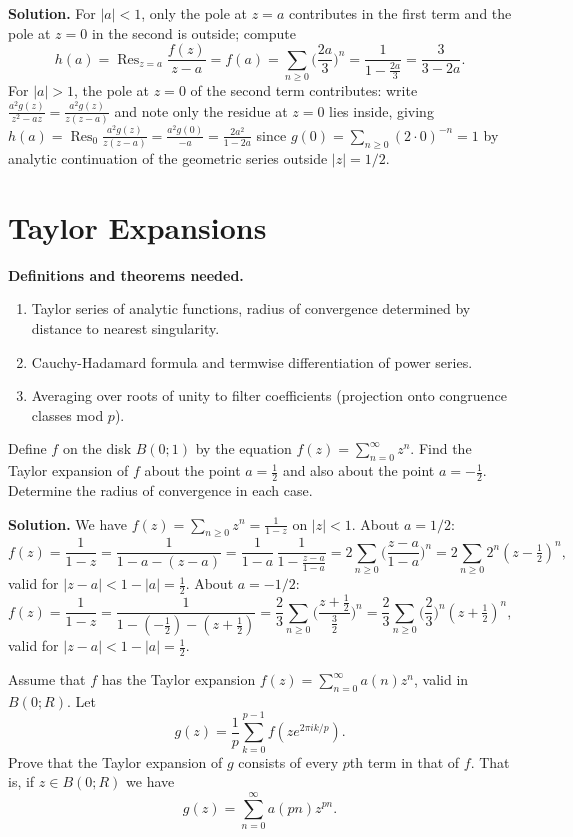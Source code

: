 \noindent\textbf{Solution.}
For $|a|<1$, only the pole at $z=a$ contributes in the first term and the pole at $z=0$ in the second is outside; compute
\[h(a)=\operatorname{Res}_{z=a}\frac{f(z)}{z-a}=f(a)=\sum_{n\ge0}\Big(\frac{2a}{3}\Big)^n=\frac{1}{1-\frac{2a}{3}}=\frac{3}{3-2a}.
\]
For $|a|>1$, the pole at $z=0$ of the second term contributes: write $\frac{a^2g(z)}{z^2-az}=\frac{a^2g(z)}{z(z-a)}$ and note only the residue at $z=0$ lies inside, giving $h(a)=\operatorname{Res}_{0}\frac{a^2g(z)}{z(z-a)}=\frac{a^2g(0)}{-a}=\frac{2a^2}{1-2a}$ since $g(0)=\sum_{n\ge0} (2\cdot0)^{-n}=1$ by analytic continuation of the geometric series outside $|z|=1/2$.

\section{Taylor Expansions}

\noindent\textbf{Definitions and theorems needed.}
\begin{enumerate}[label=(\alph*)]
\item Taylor series of analytic functions, radius of convergence determined by distance to nearest singularity.
\item Cauchy-Hadamard formula and termwise differentiation of power series.
\item Averaging over roots of unity to filter coefficients (projection onto congruence classes mod $p$).
\end{enumerate}

\begin{problembox}
Define \( f \) on the disk \( B(0; 1) \) by the equation \( f(z) = \sum_{n=0}^{\infty} z^n \). Find the Taylor expansion of \( f \) about the point \( a = \frac{1}{2} \) and also about the point \( a = -\frac{1}{2} \). Determine the radius of convergence in each case.
\end{problembox}

\noindent\textbf{Solution.}
We have $f(z)=\sum_{n\ge0}z^n=\frac{1}{1-z}$ on $|z|<1$. About $a=1/2$:
\[f(z)=\frac{1}{1-z}=\frac{1}{1-a-(z-a)}=\frac{1}{1-a}\,\frac{1}{1-\frac{z-a}{1-a}}=2\sum_{n\ge0}\Big(\frac{z-a}{1-a}\Big)^n=2\sum_{n\ge0}2^n(z-\tfrac12)^n,
\]
valid for $|z-a|<1-|a|=\tfrac12$. About $a=-1/2$:
\[f(z)=\frac{1}{1-z}=\frac{1}{1-(-\tfrac12)-(z+\tfrac12)}=\frac{2}{3}\sum_{n\ge0}\Big(\frac{z+\tfrac12}{\tfrac32}\Big)^n=\frac{2}{3}\sum_{n\ge0}\Big(\frac{2}{3}\Big)^n(z+\tfrac12)^n,
\]
valid for $|z-a|<1-|a|=\tfrac12$.

\begin{problembox}
Assume that \( f \) has the Taylor expansion \( f(z) = \sum_{n=0}^{\infty} a(n)z^n \), valid in \( B(0; R) \). Let
\[g(z) = \frac{1}{p} \sum_{k=0}^{p-1} f(ze^{2\pi ik/p}).\]
Prove that the Taylor expansion of \( g \) consists of every \( p \)th term in that of \( f \). That is, if \( z \in B(0; R) \) we have
\[g(z) = \sum_{n=0}^{\infty} a(pn)z^{pn}.\]
\end{problembox}

